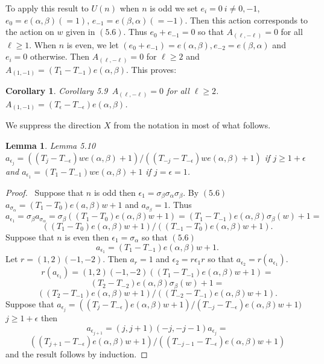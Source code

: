 \documentclass{memo-l}
\newtheorem{lemma}[theorem]{Lemma}
\newtheorem{corollary}[theorem]{Corollary}
\theoremstyle{definition}
\theoremstyle{remark}
\numberwithin{section}{chapter}
\numberwithin{equation}{chapter}
\begin{document}
{\medskip}

   To apply this result to $U(n)$ when $n$ is odd we set $e_{i}  =  0\
   i \ne
0,-1$, $e_{0}  =  e({\alpha},{\beta}) ( = 1)$, $e_{-1}  =  e({\beta},{\alpha})
( = -1)$.  Then this action corresponds to the action on $w$ given in
$(5.6)$.  Thus $e_{0}+e_{-1} = 0$ so that $A_{({\ell},-{\ell})}  =  0$ for all
${\ell} \ge  1$.  When $n$ is even, we let $(e_{0}+e_{-1})  =
e({\alpha},{\beta}), e_{-2}  =  e({\beta},{\alpha})$ and $e_{i}  =  0$
otherwise.  Then $A_{({\ell},-{\ell})}  =  0$ for ${\ell} \ge  2$ and
$A_{(1,-1)}  =  (T_{1}-T_{-1})e({\alpha},{\beta})$.  This proves:


\begin{corollary}{Corollary 5.9}\ $A_{(\ell,-\ell)} = 0$ for all
${\ell} \ge  2$.  $A_{(1,-1)}  =
(T_{{\epsilon}}-T_{-{\epsilon}})e({\alpha},{\beta})$.
\end{corollary}

{\medskip}

We suppress the direction $X$ from the notation in most of what follows.

\begin{lemma}{Lemma 5.10}\ $a_{{\epsilon}_{j}}  =
((T_{j}-T_{-{\epsilon}})we({\alpha},{\beta})+1)/((T_{-j}-T_{-{\epsilon}})we({\alpha},{\beta})+1)$
if $j \ge  1+{\epsilon}$ and $a_{{\epsilon}_{1}}  =
(T_{1}-T_{-1})we({\alpha},{\beta})+1$ if $j = {\epsilon} = 1$.
\end{lemma}

\begin{proof} \ Suppose that $n$ is odd then ${\epsilon}_{1}  =
{\sigma}_{{\beta}}{\sigma}_{{\alpha}}{\sigma}_{{\beta}}$.  By $(5.6)$
$ a_{{\sigma}_{{\alpha}}} =  (T_{1}-T_{0})e(a,{\beta})w+1$ and
$a_{{\sigma}_{{\beta}}} = 1$.  Thus
$$
a_{{\epsilon}_{1}} = {\sigma}_{{\beta}}a_{{\sigma}_{{\alpha}}}
 =  {\sigma}_{{\beta}}((T_{1}-T_{0})e({\alpha},{\beta})w+1)  =
(T_{1}-T_{-1})e({\alpha},{\beta}){\sigma}_{{\beta}}(w) + 1  =
$$
$$
((T_{1}-T_{0})e({\alpha},{\beta})w+1)/((T_{-1}-T_{0})e({\alpha},{\beta})w+1).
$$
Suppose that $n$ is even then ${\epsilon}_{1}  =  {\sigma}_{{\alpha}}$ so
that $(5.6)$
$$
a_{{\epsilon}_{1}} = (T_{1}-T_{-1})e({\alpha},{\beta})w+1.
$$
Let $r  =  (1,2)(-1,-2)$.  Then $a_{r}  =  1$ and ${\epsilon}_{2}  =
r{\epsilon}_{1}r$ so that $a_{{\epsilon}_{2}} =  r(a_{{\epsilon}_{1}})$.
$$
r(a_{{\epsilon}_{1}})  =
(1,2)(-1,-2)((T_{1}-T_{-1})e({\alpha},{\beta})w+1)  =
$$
$$
(T_{2}-T_{-2})e({\alpha},{\beta}){\sigma}_{{\beta}}(w)+1  =
$$
$$
((T_{2}-T_{-1})e({\alpha},{\beta})w+1)/((T_{-2}-T_{-1})e({\alpha},{\beta})w+1).
$$
Suppose that $a_{{\epsilon}_{j}}  =
((T_{j}-T_{-{\epsilon}})e({\alpha},{\beta})w+1)/(T_{-j}-T_{-{\epsilon}})e({\alpha},{\beta})w+1)$
$ j \ge  1+{\epsilon}$ then
$$
a_{{\epsilon}_{j+1}}  =  (j,j+1)(-j,-j-1)a_{{\epsilon}_{j}}  =
$$
$$
((T_{j+1}-T_{-{\epsilon}})e({\alpha},
{\beta})w+1)/((T_{-j-1}-T_{-{\epsilon}})e({\alpha},{\beta})w+1)
$$
and the result follows by induction.
\end{proof}
\end{document}
